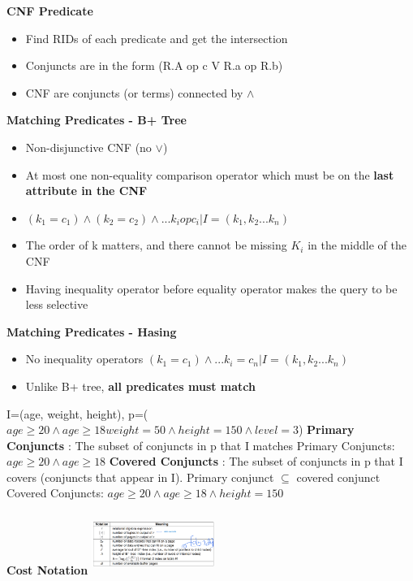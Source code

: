 \documentclass[10pt, landscape]{article}
\begin{document}
\begin{multicols}{4}
\textbf{CNF Predicate}
\begin{itemize}
  \item Find RIDs of each predicate and get the intersection
  \item Conjuncts are in the form (R.A op c V R.a op R.b) 
  \item CNF are conjuncts (or terms) connected by $\land$ 
\end{itemize}

\textbf{Matching Predicates - B+ Tree}
\begin{itemize}
  \item Non-disjunctive CNF (no $\lor$)
  \item At most one non-equality comparison operator which must be on the \textbf{last attribute in the CNF}
  \item $(k_1=c_1) \land (k_2=c_2) \land ...k_i op c_i | I=(k_1, k_2...k_n)$ 
  \item The order of k matters, and there cannot be missing $K_i$ in the middle of the CNF
  \item Having inequality operator before equality operator makes the query to be less selective 
\end{itemize}

\textbf{Matching Predicates - Hasing}
\begin{itemize}
  \item No inequality operators $(k_1=c_1) \land ... k_i =c_n | I=(k_1, k_2...k_n)$
  \item Unlike B+ tree, \textbf{all predicates must match}
\end{itemize}

I=(age, weight, height), p=($age \geq 20 \land age \geq 18 weight=50 \land height=150 \land level=3$) \newline
\textbf{Primary Conjuncts} : The subset of conjuncts in p that I matches \newline
Primary Conjuncts: $age \geq 20 \land age \geq 18$ \newline
\textbf{Covered Conjuncts} : The subset of conjuncts in p that I covers (conjuncts that appear in I). Primary conjunct $\subseteq$ covered conjunct \newline
Covered Conjuncts: $age \geq 20 \land age \geq 18 \land height=150$ \newline

\textbf{Cost Notation}  \newline
\includegraphics[width=4cm, height=2cm]{notation.png}


\end{multicols}
\end{document}
